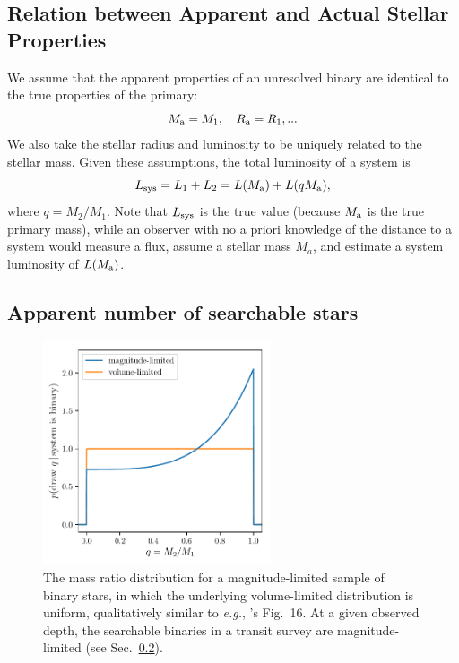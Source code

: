\documentclass[12pt,modern]{aastex61}
\renewcommand{\a}{_{\rm a}}
\begin{document}
\subsection{Relation between Apparent and Actual Stellar Properties}

We assume that the apparent properties of an unresolved binary are identical to
the true properties of the primary:
\begin{equation}
M\a=M_1, \quad R\a=R_1, ...
\end{equation}
We also take the stellar radius and luminosity to be uniquely related to the 
stellar mass.
Given these assumptions, the total luminosity of a system is
\begin{equation}
L_{\rm sys}=L_1+L_2=L(M\a)+L(qM\a),
\end{equation}
where $q=M_2/M_1$. Note that $L_{\rm sys}$ is the true value (because $M\a$ is 
the true primary mass), while an observer with no a priori knowledge of the 
distance to a system would measure a flux, assume a stellar mass $M_a$, and 
estimate a system luminosity of $L(M\a)$.

\subsection{Apparent number of searchable stars}
\label{subsec:apparent_N_searchable}

\begin{figure}[!tb]
    \centering
    \includegraphics[width=0.6\textwidth]{figures/mass_ratio_distribution.pdf}
    \caption{
        The mass ratio distribution for a magnitude-limited sample of 
        binary stars, in which the underlying volume-limited distribution is 
        uniform, qualitatively similar to {\it e.g.}, 
        \citet{raghavan_survey_2010}'s Fig.~16.
        At a given observed depth, the searchable binaries in a transit survey 
        are magnitude-limited (see Sec.~\ref{subsec:apparent_N_searchable}).
    }
    \label{fig:q_distribn_mag_limited}
\end{figure}
\end{document}
